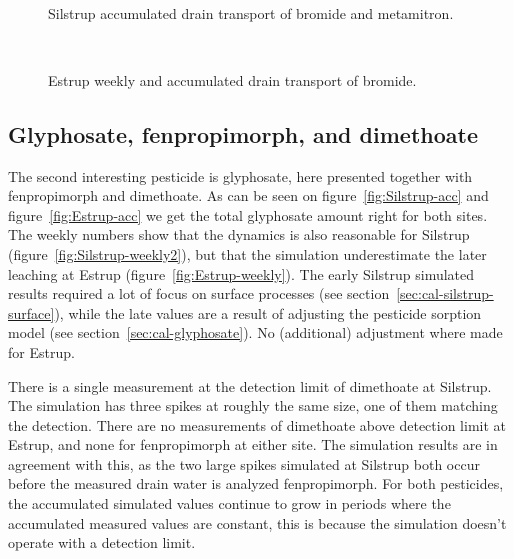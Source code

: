 \begin{figure}[htbp]
  \begin{center}
    \\
  \end{center}
  \caption{Silstrup accumulated drain transport of bromide and metamitron.}
  \label{fig:Silstrup-bromide-acc}
\end{figure}

\begin{figure}[htbp]
  \begin{center}
    \\
  \end{center}
  \caption{Estrup weekly and accumulated drain transport of bromide.}
  \label{fig:Estrup-bromide-drain}
\end{figure}

\FloatBarrier
\subsection{Glyphosate,  fenpropimorph, and dimethoate}

The second interesting pesticide is glyphosate, here presented
together with fenpropimorph and dimethoate.  As can be seen on
figure~\ref{fig:Silstrup-acc} and figure~\ref{fig:Estrup-acc} we get
the total glyphosate amount right for both sites.  The weekly numbers
show that the dynamics is also reasonable for Silstrup
(figure~\ref{fig:Silstrup-weekly2}), but that the simulation
underestimate the later leaching at Estrup
(figure~\ref{fig:Estrup-weekly}).  The early Silstrup simulated
results required a lot of focus on surface processes (see
section~\ref{sec:cal-silstrup-surface}), while the late values are a
result of adjusting the pesticide sorption model (see
section~\ref{sec:cal-glyphosate}).  No (additional) adjustment where
made for Estrup.

There is a single measurement at the detection limit of dimethoate at
Silstrup.  The simulation has three spikes at roughly the same size,
one of them matching the detection.  There are no measurements of
dimethoate above detection limit at Estrup, and none for fenpropimorph
at either site.  The simulation results are in agreement with this, as
the two large spikes simulated at Silstrup both occur before the
measured drain water is analyzed fenpropimorph.  For both pesticides,
the accumulated simulated values continue to grow in periods where the
accumulated measured values are constant, this is because the
simulation doesn't operate with a detection limit.

